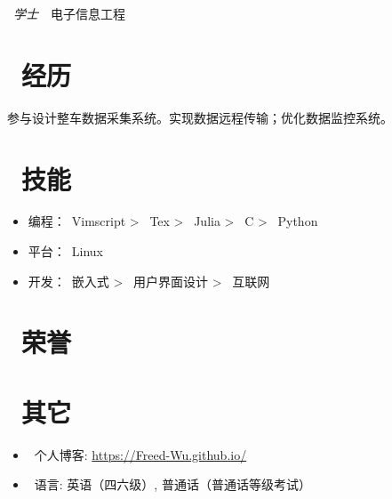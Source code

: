 \documentclass[../main]{subfiles}
\begin{document}
%
\label{sub:zh_njust}

\faGraduationCap\ \emph{学士}\ \faBolt\ 电子信息工程

\section{\faUsers\ 经历}%
\label{sub:zh_experience}

%
\label{sub:zh_fsae}

参与设计整车数据采集系统。实现数据远程传输；优化数据监控系统。

%
\label{sub:zh_school}


\section{\faCogs\ 技能}%
\label{sec:zh_skills}

\begin{itemize}
	\item 编程：\faVimeo\ Vimscript > \faFile\ Tex >
	      \faDraftingCompass\ Julia > \faCuttlefish\ C > \faPython\ Python
	\item 平台：\faLinux\ Linux
	\item 开发：\faMicrochip\ 嵌入式 > \faFile\ 用户界面设计 > \faGlobeAsia\ 互联网
\end{itemize}

\section{\faHeart\ 荣誉}%
\label{sec:zh_honors}


\section{\faInfo\ 其它}%
\label{sec:zh_miscellaneous}

\begin{itemize}
	\item\faBlog\ 个人博客: \url{https://Freed-Wu.github.io/}
	\item\faLanguage\ 语言: 英语（四六级）, 普通话（普通话等级考试）
\end{itemize}
\end{document}

